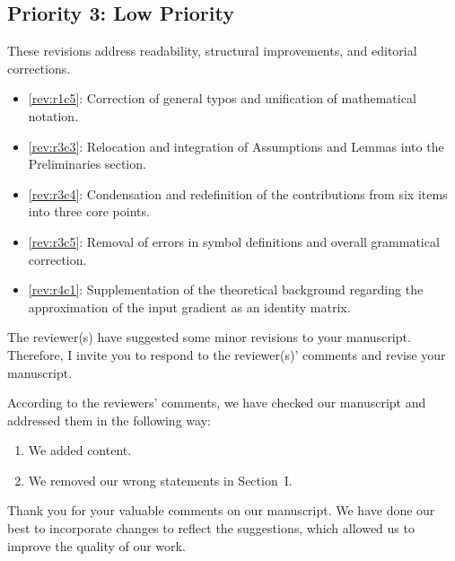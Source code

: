 \documentclass[12pt,english]{reviewresponse}
\begin{document}
\subsection*{Priority 3: Low Priority}
These revisions address readability, structural improvements, and editorial corrections.
\begin{itemize}
    \item \cref{rev:r1c5}: Correction of general typos and unification of mathematical notation.
    \item \cref{rev:r3c3}: Relocation and integration of Assumptions and Lemmas into the Preliminaries section.
    \item \cref{rev:r3c4}: Condensation and redefinition of the contributions from six items into three core points.
    \item \cref{rev:r3c5}: Removal of errors in symbol definitions and overall grammatical correction.
    \item \cref{rev:r4c1}: Supplementation of the theoretical background regarding the approximation of the input gradient as an identity matrix.
\end{itemize}

\newpage

\editor
\begin{generalcomment}
    The reviewer(s) have suggested some minor revisions to your manuscript. Therefore, I invite you to respond to the reviewer(s)' comments and revise your manuscript.
\end{generalcomment}
\begin{revresponse}
    According to the reviewers' comments, we have checked our manuscript and addressed them in the following way:
    \begin{enumerate}
        \item We added content.
        \item We removed our wrong statements in Section~I.
    \end{enumerate}
\end{revresponse}
\begin{concludingresponse}
    Thank you for your valuable comments on our manuscript. 
    We have done our best to incorporate changes to reflect the suggestions, which allowed us to improve the quality of our work.
\end{concludingresponse}
\end{document}
